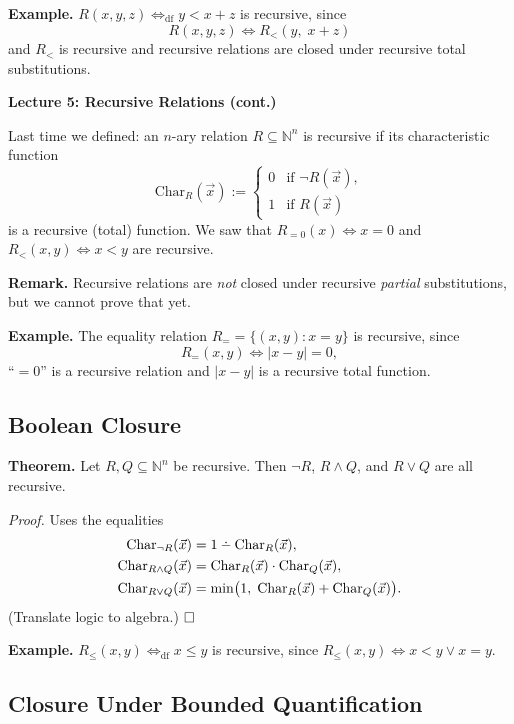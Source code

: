 \documentclass[11pt]{article}
\newcommand{\dotminus}{\mathbin{\ooalign{\hidewidth\raise0.5ex\hbox{$\cdot$}\hidewidth\cr$-$\cr}}}
\begin{document}
\textbf{Example.} $R(x, y, z) \iff_{\mathrm{df}} y < x + z$ is recursive, since
\[
    R(x, y, z) \iff R_{<}(y,\; x + z)
\]
and $R_{<}$ is recursive and recursive relations are closed under recursive total substitutions.

\newpage

{\LARGE\bfseries Lecture 5: Recursive Relations (cont.)}

\noindent Last time we defined: an $n$-ary relation $R \subseteq \mathbb{N}^n$ is recursive if its characteristic function
\[
    \mathrm{Char}_R(\vec{x}) := \begin{cases} 0 & \text{if } \neg R(\vec{x}), \\ 1 & \text{if } R(\vec{x}) \end{cases}
\]
is a recursive (total) function. We saw that $R_{=0}(x) \iff x = 0$ and $R_{<}(x,y) \iff x < y$ are recursive.

\textbf{Remark.} Recursive relations are \emph{not} closed under recursive \emph{partial} substitutions, but we cannot prove that yet.

\textbf{Example.} The equality relation $R_{=} = \{(x,y) : x = y\}$ is recursive, since
\[
    R_{=}(x,y) \iff |x - y| = 0,
\]
``$= 0$'' is a recursive relation and $|x - y|$ is a recursive total function.

\subsection{Boolean Closure}

\textbf{Theorem.} Let $R, Q \subseteq \mathbb{N}^n$ be recursive. Then $\neg R$, $R \land Q$, and $R \lor Q$ are all recursive.

\textit{Proof.} Uses the equalities
\begin{align*}
    \mathrm{Char}_{\neg R}(\vec{x}) &= 1 \dotminus \mathrm{Char}_R(\vec{x}), \\
    \mathrm{Char}_{R \land Q}(\vec{x}) &= \mathrm{Char}_R(\vec{x}) \cdot \mathrm{Char}_Q(\vec{x}), \\
    \mathrm{Char}_{R \lor Q}(\vec{x}) &= \min\bigl(1,\; \mathrm{Char}_R(\vec{x}) + \mathrm{Char}_Q(\vec{x})\bigr).
\end{align*}
(Translate logic to algebra.) $\hfill\square$

\textbf{Example.} $R_{\le}(x, y) \iff_{\mathrm{df}} x \le y$ is recursive, since $R_{\le}(x,y) \iff x < y \lor x = y$.

\subsection{Closure Under Bounded Quantification}
\end{document}
